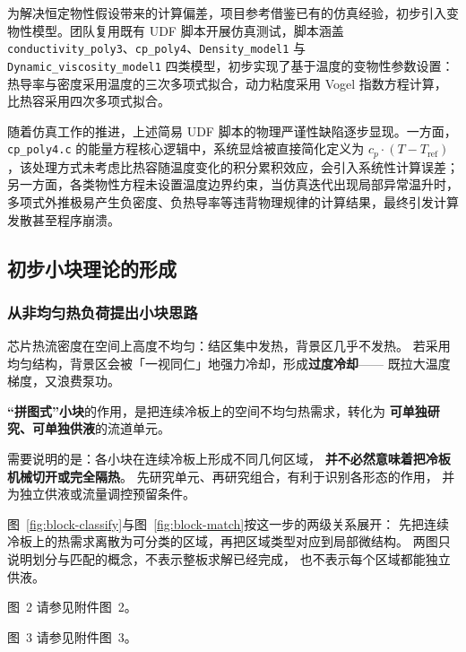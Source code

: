 \documentclass[stage1,fontset=fandol]{ydzjreport}
\makeatletter
\newcommand{\submissionnumber}[1]{\def\@currentlabel{#1}}
\makeatother
\begin{document}
为解决恒定物性假设带来的计算偏差，项目参考借鉴已有的仿真经验，初步引入变物性模型。团队复用既有 UDF 脚本开展仿真测试，脚本涵盖 \texttt{conductivity\_poly3}、\texttt{cp\_poly4}、\texttt{Density\_model1} 与 \texttt{Dynamic\_viscosity\_model1} 四类模型，初步实现了基于温度的变物性参数设置：热导率与密度采用温度的三次多项式拟合，动力粘度采用 Vogel 指数方程计算，比热容采用四次多项式拟合。

随着仿真工作的推进，上述简易 UDF 脚本的物理严谨性缺陷逐步显现。一方面，\texttt{cp\_poly4.c} 的能量方程核心逻辑中，系统显焓被直接简化定义为 \(c_p \cdot (T-T_{\mathrm{ref}})\)，该处理方式未考虑比热容随温度变化的积分累积效应，会引入系统性计算误差；另一方面，各类物性方程未设置温度边界约束，当仿真迭代出现局部异常温升时，多项式外推极易产生负密度、负热导率等违背物理规律的计算结果，最终引发计算发散甚至程序崩溃。

\subsection{初步小块理论的形成}

\subsubsection{从非均匀热负荷提出小块思路}

	芯片热流密度在空间上高度不均匀：结区集中发热，背景区几乎不发热。
	若采用均匀结构，背景区会被「一视同仁」地强力冷却，形成\textbf{过度冷却}——
	既拉大温度梯度，又浪费泵功。

	\textbf{“拼图式”小块}的作用，是把连续冷板上的空间不均匀热需求，转化为
	\textbf{可单独研究、可单独供液}的流道单元。

	需要说明的是：各小块在连续冷板上形成不同几何区域，
	\textbf{并不必然意味着把冷板机械切开或完全隔热}。
	先研究单元、再研究组合，有利于识别各形态的作用，
	并为独立供液或流量调控预留条件。

	图~\ref{fig:block-classify}与图~\ref{fig:block-match}按这一步的两级关系展开：
	先把连续冷板上的热需求离散为可分类的区域，再把区域类型对应到局部微结构。
	两图只说明划分与匹配的概念，不表示整板求解已经完成，
	也不表示每个区域都能独立供液。


\par\noindent \begingroup\submissionnumber{2}\label{fig:block-classify}\endgroup 图~2 请参见附件图~2。\par



\par\noindent \begingroup\submissionnumber{3}\label{fig:block-match}\endgroup 图~3 请参见附件图~3。\par
\end{document}
